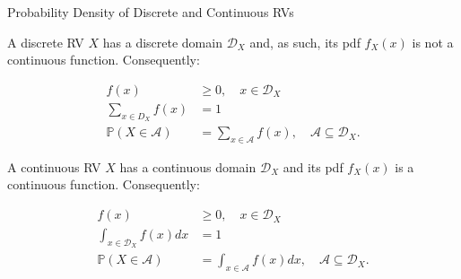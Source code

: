 \documentclass[9pt]{beamer}
\begin{document}
%
\begin{frame}{Probability Density of Discrete and Continuous RVs}

A discrete RV $X$ has a discrete domain $\mathcal{D}_X$ and, as such, its pdf $f_X(x)$ is not a continuous function. Consequently:
\begin{block}{}

\begin{align*}
f(x)&\geq 0,\quad x\in \mathcal{D}_X\\
\sum_{x\in D_X}f(x)&=1\\
\mathbb{P}(X\in \mathcal{A})&=\sum_{x\in \mathcal{A}}f(x),\quad  \mathcal{A}\subseteq \mathcal{D}_X.
\end{align*}
\end{block}

A continuous RV $X$ has a continuous domain $\mathcal{D}_X$ and its pdf $f_X(x)$ is a continuous function. Consequently:
\begin{block}{}
\begin{align*}
f(x)&\geq 0,\quad x\in \mathcal{D}_X\\
\int_{x\in \mathcal{D}_X}f(x)dx&=1\\
\mathbb{P}(X\in \mathcal{A})&=\int_{x\in \mathcal{A}}f(x)dx,\quad  \mathcal{A}\subseteq \mathcal{D}_X.
\end{align*}
\end{block}



\end{frame}
\end{document}

